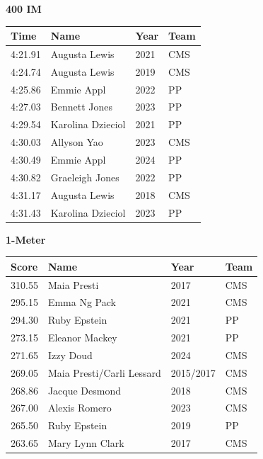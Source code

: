 \vspace{1.2em}
\noindent\begin{minipage}[t]{0.98\textwidth}
\centering
\textbf{\textcolor{teamprimary}{400 IM}}\par
\vspace{0.5em}
\centering
\small
\renewcommand{\arraystretch}{1.0}
\setlength{\tabcolsep}{4pt}
\begin{tabular}{@{}p{2.5cm}p{4.5cm}p{1.5cm}p{2.5cm}@{}}
\toprule
\textbf{Time} & \textbf{Name} & \textbf{Year} & \textbf{Team} \\
\midrule
4:21.91 & Augusta Lewis & 2021 & CMS \\
4:24.74 & Augusta Lewis & 2019 & CMS \\
4:25.86 & Emmie Appl & 2022 & PP \\
4:27.03 & Bennett Jones & 2023 & PP \\
4:29.54 & Karolina Dzieciol & 2021 & PP \\
4:30.03 & Allyson Yao & 2023 & CMS \\
4:30.49 & Emmie Appl & 2024 & PP \\
4:30.82 & Graeleigh Jones & 2022 & PP \\
4:31.17 & Augusta Lewis & 2018 & CMS \\
4:31.43 & Karolina Dzieciol & 2023 & PP \\
\bottomrule
\end{tabular}
\end{minipage}
\vspace{1.2em}
\noindent\begin{minipage}[t]{0.98\textwidth}
\centering
\textbf{\textcolor{teamprimary}{1-Meter}}\par
\vspace{0.5em}
\centering
\small
\renewcommand{\arraystretch}{1.0}
\setlength{\tabcolsep}{4pt}
\begin{tabular}{@{}p{2.5cm}p{4.5cm}p{1.5cm}p{2.5cm}@{}}
\toprule
\textbf{Score} & \textbf{Name} & \textbf{Year} & \textbf{Team} \\
\midrule
310.55 & Maia Presti & 2017 & CMS \\
295.15 & Emma Ng Pack & 2021 & CMS \\
294.30 & Ruby Epstein & 2021 & PP \\
273.15 & Eleanor Mackey & 2021 & PP \\
271.65 & Izzy Doud & 2024 & CMS \\
269.05 & Maia Presti/Carli Lessard & 2015/2017 & CMS \\
268.86 & Jacque Desmond & 2018 & CMS \\
267.00 & Alexis Romero & 2023 & CMS \\
265.50 & Ruby Epstein & 2019 & PP \\
263.65 & Mary Lynn Clark & 2017 & CMS \\
\bottomrule
\end{tabular}
\end{minipage}
